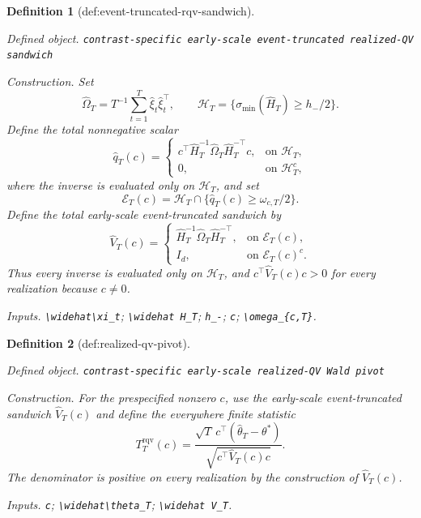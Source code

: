 \documentclass{article}
\newtheorem{definition}{Definition}
\begin{document}
\begin{definition}[def:event-truncated-rqv-sandwich]\label{def:event-truncated-rqv-sandwich}
\par\smallskip\noindent\emph{Defined object.} \texttt{contrast-\allowbreak{}specific early-\allowbreak{}scale event-\allowbreak{}truncated realized-\allowbreak{}QV sandwich}
\par\smallskip\noindent\emph{Construction.} Set
\[
 \widehat\Omega_T=T^{-1}\sum_{t=1}^T\widehat\xi_t\widehat\xi_t^\top,
 \qquad
 \mathcal H_T=\{\sigma_{\min}(\widehat H_T)\ge h_-/2\}.
\]
Define the total nonnegative scalar
\[
 \widehat q_T(c)=
 \begin{cases}
 c^\top\widehat H_T^{-1}\widehat\Omega_T\widehat H_T^{-\top}c,
   &\text{on }\mathcal H_T,\\
 0,&\text{on }\mathcal H_T^c,
 \end{cases}
\]
where the inverse is evaluated only on \(\mathcal H_T\), and set
\[
 \mathcal E_T(c)=\mathcal H_T\cap\{\widehat q_T(c)\ge\omega_{c,T}/2\}.
\]
Define the total early-scale event-truncated sandwich by
\[
 \widehat V_T(c)=
 \begin{cases}
 \widehat H_T^{-1}\widehat\Omega_T\widehat H_T^{-\top},
   &\text{on }\mathcal E_T(c),\\
 I_d,&\text{on }\mathcal E_T(c)^c.
 \end{cases}
\]
Thus every inverse is evaluated only on \(\mathcal H_T\), and \(c^\top\widehat V_T(c)c>0\) for every realization because \(c\ne0\).
\par\smallskip\noindent\emph{Inputs.} \texttt{\textbackslash{}\allowbreak{}widehat\textbackslash{}\allowbreak{}xi\_\allowbreak{}t}; \texttt{\textbackslash{}\allowbreak{}widehat H\_\allowbreak{}T}; \texttt{h\_\allowbreak{}-\allowbreak{}}; \texttt{c}; \texttt{\textbackslash{}\allowbreak{}omega\_\allowbreak{}\{c,\allowbreak{}T\}\allowbreak{}}.
\end{definition}

\begin{definition}[def:realized-qv-pivot]\label{def:realized-qv-pivot}
\par\smallskip\noindent\emph{Defined object.} \texttt{contrast-\allowbreak{}specific early-\allowbreak{}scale realized-\allowbreak{}QV Wald pivot}
\par\smallskip\noindent\emph{Construction.} For the prespecified nonzero \(c\), use the early-scale event-truncated sandwich \(\widehat V_T(c)\) and define the everywhere finite statistic
\[
 T_T^{\mathrm{rqv}}(c)=
 \frac{\sqrt T\,c^\top(\widehat\theta_T-\theta^*)}
 {\sqrt{c^\top\widehat V_T(c)c}}.
\]
The denominator is positive on every realization by the construction of \(\widehat V_T(c)\).
\par\smallskip\noindent\emph{Inputs.} \texttt{c}; \texttt{\textbackslash{}\allowbreak{}widehat\textbackslash{}\allowbreak{}theta\_\allowbreak{}T}; \texttt{\textbackslash{}\allowbreak{}widehat V\_\allowbreak{}T}.
\end{definition}
\end{document}
